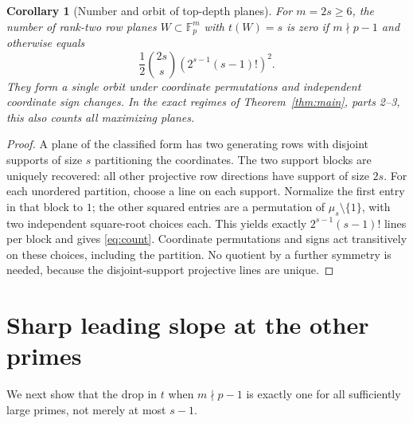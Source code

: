 \documentclass[11pt]{article}
\newtheorem{corollary}[theorem]{Corollary}
\theoremstyle{remark}\newtheorem{remark}[theorem]{Remark}
\newcommand{\F}{\mathbb F}
\begin{document}
\begin{corollary}[Number and orbit of top-depth planes]\label{cor:count}
For $m=2s\ge6$, the number of rank-two row planes $W\subset\F_p^m$ with $t(W)=s$ is zero if $m\nmid p-1$ and otherwise equals
\begin{equation}\label{eq:count}
 \frac12\binom{2s}{s}\left(2^{s-1}(s-1)!\right)^2.
\end{equation}
They form a single orbit under coordinate permutations and independent coordinate sign changes. In the exact regimes of Theorem~\ref{thm:main}, parts 2--3, this also counts all maximizing planes.
\end{corollary}
\begin{proof}
A plane of the classified form has two generating rows with disjoint supports of size $s$ partitioning the coordinates. The two support blocks are uniquely recovered: all other projective row directions have support of size $2s$. For each unordered partition, choose a line on each support. Normalize the first entry in that block to $1$; the other squared entries are a permutation of $\mu_s\setminus\{1\}$, with two independent square-root choices each. This yields exactly $2^{s-1}(s-1)!$ lines per block and gives \eqref{eq:count}. Coordinate permutations and signs act transitively on these choices, including the partition. No quotient by a further symmetry is needed, because the disjoint-support projective lines are unique.
\end{proof}

\section{Sharp leading slope at the other primes}\label{sec:curve}
We next show that the drop in $t$ when $m\nmid p-1$ is exactly one for all sufficiently large primes, not merely at most $s-1$.
\end{document}
